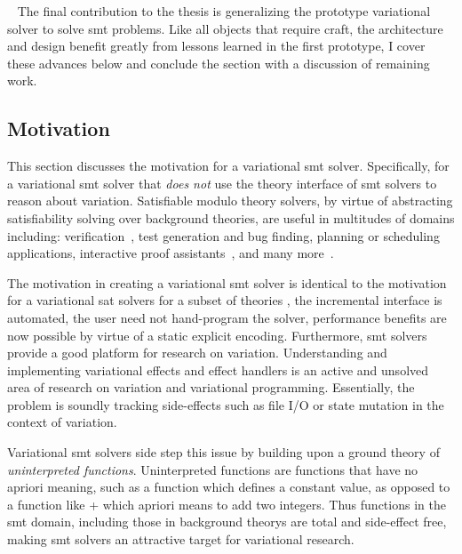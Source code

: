 ~\label{sec:vsmt} The final contribution to the thesis is generalizing the
prototype variational solver to solve \ac{smt} problems. Like all objects that
require craft, the architecture and design benefit greatly from lessons learned
in the first prototype, I cover these advances below and conclude the section
with a discussion of remaining work.

\subsection{Motivation}
This section discusses the motivation for a variational \ac{smt} solver.
Specifically, for a variational \ac{smt} solver that \emph{does not} use the
theory interface of \ac{smt} solvers to reason about variation. Satisfiable
modulo theory solvers, by virtue of abstracting satisfiability solving over
background theories, are useful in multitudes of domains including:
verification~\cite{boogiepl-a-typed-procedural-language-for-checking-object-oriented-programs},
test generation and bug
finding\cite{Cadar:2008:KUA:1855741.1855756,Godefroid:2012:SWF:2090147.2094081},
planning or scheduling
applications\cite{10.1109/RTSS.2010.25,10.1145/2038642.2038689}, interactive
proof
assistants~\cite{10.1007/978-3-540-78800-3_24,10.1007/978-3-319-08867-9_49}, and
many more~\cite{10.5555/1391237}.

The motivation in creating a variational \ac{smt} solver is identical to the
motivation for a variational \ac{sat} solvers for a subset of theories \ie{},
the incremental interface is automated, the user need not hand-program the
solver, performance benefits are now possible by virtue of a static explicit
encoding. Furthermore, \ac{smt} solvers provide a good platform for research on
variation. Understanding and implementing variational effects and effect
handlers is an active and unsolved area of research on variation and variational
programming. Essentially, the problem is soundly tracking side-effects such as
file I/O or state mutation in the context of variation.

Variational \ac{smt} solvers side step this issue by building upon a ground
theory of \emph{uninterpreted functions}. Uninterpreted functions are functions
that have no apriori meaning, such as a function which defines a constant value,
as opposed to a function like + which apriori means to add two integers. Thus
functions in the \ac{smt} domain, including those in background theorys are
total and side-effect free, making \ac{smt} solvers an attractive target for
variational research.

